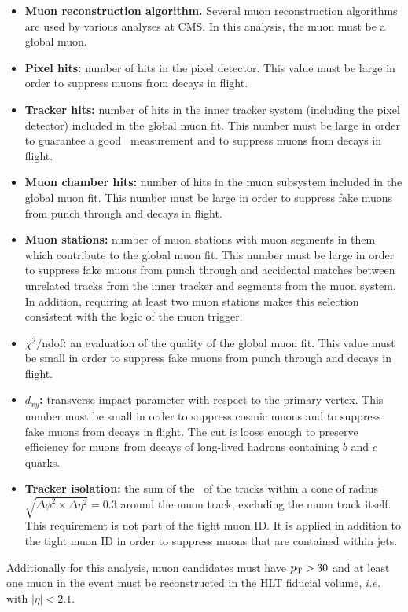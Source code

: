 \begin{itemize}
  \item {\bf Muon reconstruction algorithm.} Several muon reconstruction algorithms 
    are used by various analyses at CMS.  In this analysis, the muon must be a global muon.
  \item {\bf Pixel hits:} number of hits in the pixel detector.  This value must be large
    in order to suppress muons from decays in flight.
  \item {\bf Tracker hits:} number of hits in the inner tracker system (including the pixel detector) included in the global
    muon fit.  This number must be large in order to guarantee a good \pt~measurement and to 
    suppress muons from decays in flight.
  \item {\bf Muon chamber hits:} number of hits in the muon subsystem included in the global
    muon fit.  This number must be large in order to suppress 
    fake muons from punch through and decays in flight.
  \item {\bf Muon stations:} number of muon stations with muon segments in them which contribute
    to the global muon fit.  This number must be large in order to suppress fake muons from punch through
    and accidental matches between unrelated tracks from the inner 
    tracker and segments from the muon system.  In addition, requiring at least two muon stations
    makes this selection consistent with the logic of the muon trigger.
  \item {\bf $\chi^2/\text{ndof}$:} an evaluation of the quality of the global muon fit.
    This value must be small in order to suppress fake muons from punch through and decays in flight.
  \item {\bf $d_{xy}$:} transverse impact parameter with respect to the primary vertex.  This
    number must be small in order to suppress cosmic muons and to 
    suppress fake muons from decays in flight.  The cut is loose enough to preserve efficiency for 
    muons from decays of long-lived hadrons containing $b$ and $c$ quarks.
  \item {\bf Tracker isolation:} the sum of the \pt~of the tracks within a cone
    of radius $\sqrt{\Delta\phi^2\times\Delta\eta^2} = 0.3$ around the muon track, excluding the muon 
    track itself.  This requirement is not part of the tight muon ID.  It is applied in addition
    to the tight muon ID in order to suppress muons that are contained within jets.
\end{itemize}

Additionally for this analysis, muon candidates must have $p_{\text{T}} > 30$ and at least one muon in the event
must be reconstructed in the HLT fiducial volume, $i.e.$ with $|\eta| < 2.1$.


